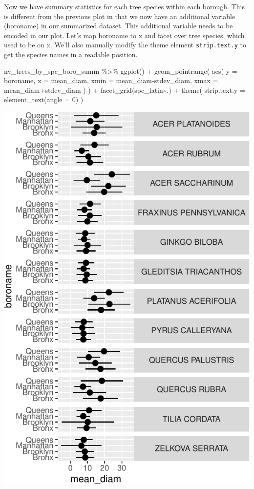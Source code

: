 \documentclass[
]{krantz}
\newenvironment{Shaded}{\begin{snugshade}}{\end{snugshade}}
\newcommand{\AttributeTok}[1]{\textcolor[rgb]{0.77,0.63,0.00}{#1}}
\newcommand{\DecValTok}[1]{\textcolor[rgb]{0.00,0.00,0.81}{#1}}
\newcommand{\FunctionTok}[1]{\textcolor[rgb]{0.00,0.00,0.00}{#1}}
\newcommand{\NormalTok}[1]{#1}
\newcommand{\SpecialCharTok}[1]{\textcolor[rgb]{0.00,0.00,0.00}{#1}}
\begin{document}
Now we have summary statistics for each tree species within each borough. This is different from the previous plot in that we now have an additional variable (boroname) in our summarized dataset. This additional variable needs to be encoded in our plot. Let's map boroname to x and facet over tree species, which used to be on x. We'll also manually modify the theme element \texttt{strip.text.y} to get the species names in a readable position.

\begin{Shaded}
\begin{Highlighting}[]
\NormalTok{ny\_trees\_by\_spc\_boro\_summ }\SpecialCharTok{\%\textgreater{}\%}
\FunctionTok{ggplot}\NormalTok{() }\SpecialCharTok{+}
  \FunctionTok{geom\_pointrange}\NormalTok{(}
    \FunctionTok{aes}\NormalTok{(}
      \AttributeTok{y =}\NormalTok{ boroname,}
      \AttributeTok{x =}\NormalTok{ mean\_diam,}
      \AttributeTok{xmin =}\NormalTok{ mean\_diam}\SpecialCharTok{{-}}\NormalTok{stdev\_diam,}
      \AttributeTok{xmax =}\NormalTok{ mean\_diam}\SpecialCharTok{+}\NormalTok{stdev\_diam}
\NormalTok{    )}
\NormalTok{  ) }\SpecialCharTok{+}
  \FunctionTok{facet\_grid}\NormalTok{(spc\_latin}\SpecialCharTok{\textasciitilde{}}\NormalTok{.) }\SpecialCharTok{+}
  \FunctionTok{theme}\NormalTok{(}
    \AttributeTok{strip.text.y =} \FunctionTok{element\_text}\NormalTok{(}\AttributeTok{angle =} \DecValTok{0}\NormalTok{)}
\NormalTok{  )}
\end{Highlighting}
\end{Shaded}

\begin{center}\includegraphics[width=0.8\linewidth]{index_files/figure-latex/unnamed-chunk-79-1} \end{center}
\end{document}
